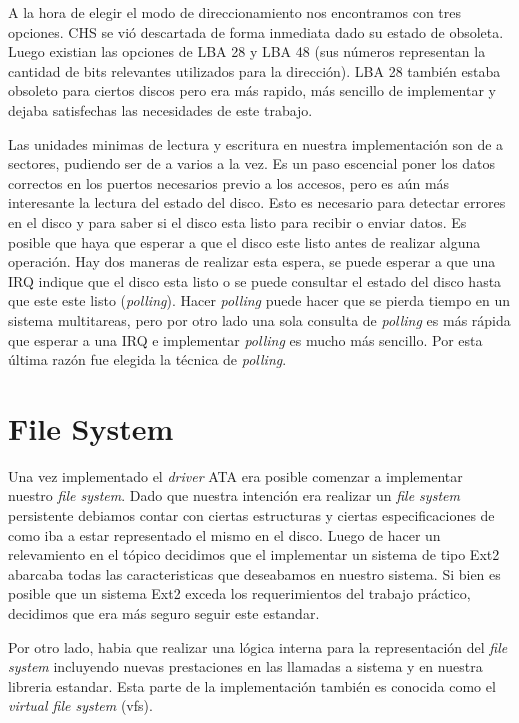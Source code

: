\documentclass[a4paper,10pt]{article}
\begin{document}
    A la hora de elegir el modo de direccionamiento nos encontramos con tres opciones. CHS se vió descartada de forma
    inmediata dado su estado de obsoleta. Luego existian las opciones de LBA 28 y LBA 48 (sus números representan
    la cantidad de bits relevantes utilizados para la dirección). LBA 28 también estaba obsoleto para ciertos discos
    pero era más rapido, más sencillo de implementar y dejaba satisfechas las necesidades de este trabajo.

    Las unidades minimas de lectura y escritura en nuestra implementación son de a sectores, pudiendo ser de a
    varios a la vez. Es un paso escencial poner los datos correctos en los puertos necesarios previo a los accesos, pero
    es aún más interesante la lectura del estado del disco. Esto es necesario para detectar errores en el disco
    y para saber si el disco esta listo para recibir o enviar datos. Es posible que haya que esperar a que el disco
    este listo antes de realizar alguna operación. Hay dos maneras de realizar esta espera, se puede esperar a que una IRQ
    indique que el disco esta listo o se puede consultar el estado del disco hasta que este este listo (\textit{polling}).
    Hacer \textit{polling} puede hacer que se pierda tiempo en un sistema multitareas, pero por otro lado una sola
    consulta de \textit{polling} es más rápida que esperar a una IRQ e implementar \textit{polling} es mucho más sencillo.
    Por esta última razón fue elegida la técnica de \textit{polling}.
\newpage
\section{File System}
    
    Una vez implementado el \textit{driver} ATA era posible comenzar a implementar nuestro \textit{file system}.
    Dado que nuestra intención era realizar un \textit{file system} persistente debiamos contar con ciertas estructuras
    y ciertas especificaciones de como iba a estar representado el mismo en el disco. Luego de hacer un relevamiento
    en el tópico decidimos que el implementar un sistema de tipo Ext2 abarcaba todas las caracteristicas que deseabamos
    en nuestro sistema. Si bien es posible que un sistema Ext2 exceda los requerimientos del trabajo práctico, decidimos
    que era más seguro seguir este estandar.
    
    Por otro lado, habia que realizar una lógica interna para la representación del \textit{file system}
    incluyendo nuevas prestaciones en las llamadas a sistema y en nuestra libreria estandar. Esta parte de la 
    implementación también es conocida como el \textit{virtual file system} (vfs).
\end{document}

